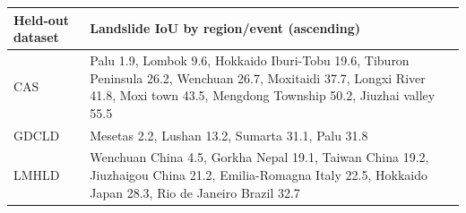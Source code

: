 \begin{tabular}{l>{\raggedright\arraybackslash}p{}}
\toprule
Held-out dataset & Landslide IoU by region/event (ascending) \\
\midrule
CAS & Palu 1.9, Lombok 9.6, Hokkaido Iburi-Tobu 19.6, Tiburon Peninsula 26.2, Wenchuan 26.7, Moxitaidi 37.7, Longxi River 41.8, Moxi town 43.5, Mengdong Township 50.2, Jiuzhai valley 55.5 \\
GDCLD & Mesetas 2.2, Lushan 13.2, Sumarta 31.1, Palu 31.8 \\
LMHLD & Wenchuan China 4.5, Gorkha Nepal 19.1, Taiwan China 19.2, Jiuzhaigou China 21.2, Emilia-Romagna Italy 22.5, Hokkaido Japan 28.3, Rio de Janeiro Brazil 32.7 \\
\bottomrule
\end{tabular}

